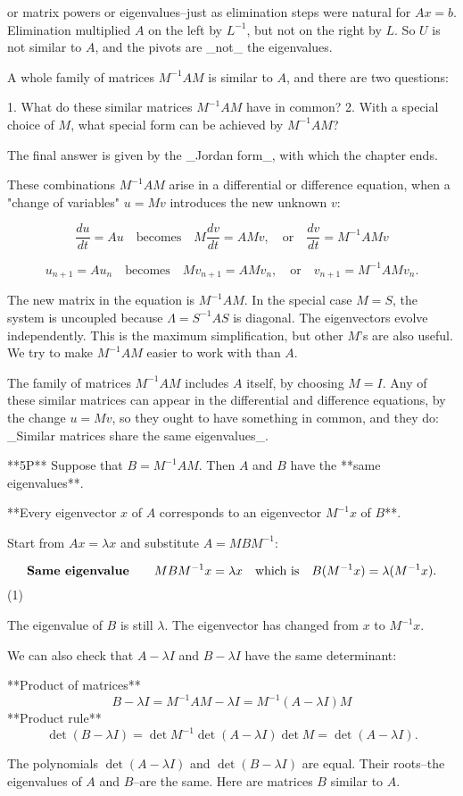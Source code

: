 or matrix powers or eigenvalues--just as elimination steps were natural for \(Ax=b\). Elimination multiplied \(A\) on the left by \(L^{-1}\), but not on the right by \(L\). So \(U\) is not similar to \(A\), and the pivots are _not_ the eigenvalues.

A whole family of matrices \(M^{-1}AM\) is similar to \(A\), and there are two questions:

1. What do these similar matrices \(M^{-1}AM\) have in common?
2. With a special choice of \(M\), what special form can be achieved by \(M^{-1}AM\)?

The final answer is given by the _Jordan form_, with which the chapter ends.

These combinations \(M^{-1}AM\) arise in a differential or difference equation, when a "change of variables" \(u=Mv\) introduces the new unknown \(v\):

\[\frac{du}{dt}=Au\quad\text{becomes}\quad M\frac{dv}{dt}=AMv,\quad\text{or} \quad\frac{dv}{dt}=M^{-1}AMv\]

\[u_{n+1}=Au_{n}\quad\text{becomes}\quad Mv_{n+1}=AMv_{n},\quad\text{or}\quad v _{n+1}=M^{-1}AMv_{n}.\]

The new matrix in the equation is \(M^{-1}AM\). In the special case \(M=S\), the system is uncoupled because \(\Lambda=S^{-1}AS\) is diagonal. The eigenvectors evolve independently. This is the maximum simplification, but other \(M\)'s are also useful. We try to make \(M^{-1}AM\) easier to work with than \(A\).

The family of matrices \(M^{-1}AM\) includes \(A\) itself, by choosing \(M=I\). Any of these similar matrices can appear in the differential and difference equations, by the change \(u=Mv\), so they ought to have something in common, and they do: _Similar matrices share the same eigenvalues_.

**5P** Suppose that \(B=M^{-1}AM\). Then \(A\) and \(B\) have the **same eigenvalues**.

**Every eigenvector \(x\) of \(A\) corresponds to an eigenvector \(M^{-1}x\) of \(B\)**.

Start from \(Ax=\lambda x\) and substitute \(A=MBM^{-1}\):

\[\text{\bf Same eigenvalue}\qquad MBM^{-1}x=\lambda x\quad\text{which is} \quad B(M^{-1}x)=\lambda(M^{-1}x).\] (1)

The eigenvalue of \(B\) is still \(\lambda\). The eigenvector has changed from \(x\) to \(M^{-1}x\).

We can also check that \(A-\lambda I\) and \(B-\lambda I\) have the same determinant:

**Product of matrices** \[B-\lambda I=M^{-1}AM-\lambda I=M^{-1}(A-\lambda I)M\]
**Product rule** \[\det(B-\lambda I)=\det M^{-1}\det(A-\lambda I)\det M=\det(A-\lambda I).\]

The polynomials \(\det(A-\lambda I)\) and \(\det(B-\lambda I)\) are equal. Their roots--the eigenvalues of \(A\) and \(B\)--are the same. Here are matrices \(B\) similar to \(A\).

 